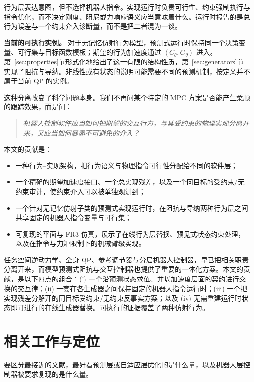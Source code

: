 \documentclass[journal]{IEEEtran}
\begin{document}
行为层表达意图，但不选择机器人指令。实现运行时负责可行性、约束强制执行与指令优化，而不决定刚度、阻尼或力响应语义应当意味着什么。运行时报告的是总行为误差与一个约束介入诊断量，而不是把二者混为一谈。

\noindent\textbf{当前的可执行实例。} 对于无记忆仿射行为模型，预测式运行时保持同一个决策变量、可行集与目标函数模板；期望的行为加速度通过 $(C_\theta,G_\theta)$ 进入。第~\ref{sec:properties}节形式化地给出了这一有限的结构性质，第~\ref{sec:generators}节实现了阻抗与导纳。非线性或有状态的说明可能需要不同的预测机制，按定义并不属于当前 QP 的实例。

这种分离改变了科学问题本身。我们不再问某个特定的 MPC 方案是否能产生柔顺的跟踪效果，而是问：

\begin{quote}
\emph{机器人控制软件应当如何把期望的交互行为，与其受约束的物理实现分离开来，又应当如何暴露不可避免的介入？}
\end{quote}

本文的贡献是：
\begin{itemize}
\item 一种行为--实现架构，把行为语义与物理指令可行性分配给不同的软件层；
\item 一个精确的期望加速度接口、一个总实现残差，以及一个同目标的受约束/无约束审计，使约束介入可以被单独观测到；
\item 一个针对无记忆仿射子类的预测式实现运行时，在阻抗与导纳两种行为层之间共享固定的机器人指令变量与可行集；
\item 可复现的平面与 FR3 仿真，展示了在线行为层替换、预见式状态约束处理，以及在指令与力矩限制下的机械臂级实现。
\end{itemize}

任务空间逆动力学、全身 QP、参考调节器与分层机器人控制器，早已把相关职责分离开来，而模型预测式阻抗与交互控制器也提供了重要的一体化方案。本文的贡献，是以下四点的组合：(i) 一个沿预测状态求值、并以加速度层面的契约进行交换的交互律；(ii) 一套在各生成器之间保持固定的机器人指令运行时；(iii) 一个把实现残差分解开的同目标受约束/无约束反事实方案；以及 (iv) 无需重建运行时状态即可进行的在线生成器替换。可执行的证据覆盖了两种仿射行为。

\section{相关工作与定位}
\label{sec:related}

要区分最接近的文献，最好看预测层或自适应层优化的是什么量，以及机器人层控制器被要求复现的是什么量。
\end{document}
